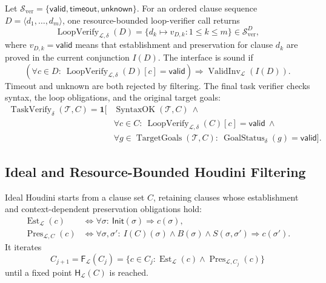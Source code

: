 Let \(\mathcal S_{\mathrm{ver}}=
\{\mathsf{valid},\mathsf{timeout},\mathsf{unknown}\}\).  For an ordered
clause sequence \(D=\langle d_1,\ldots,d_m\rangle\), one resource-bounded
loop-verifier call returns
\begin{equation}
  \operatorname{LoopVerify}_{\mathcal L,\delta}(D)
  =\{d_k\mapsto v_{D,k}:1\le k\le m\}
  \in\mathcal S_{\mathrm{ver}}^{D},
  \label{eq:formal-loop-verify-map}
\end{equation}
where \(v_{D,k}=\mathsf{valid}\) means that establishment and preservation
for clause \(d_k\) are proved in the current conjunction \(I(D)\).  The
interface is sound if
\begin{equation}
  \left(\forall c\in D:\
    \operatorname{LoopVerify}_{\mathcal L,\delta}(D)[c]=\mathsf{valid}\right)
  \Rightarrow \operatorname{ValidInv}_{\mathcal L}(I(D)).
  \label{eq:formal-loop-verify-soundness}
\end{equation}
Timeout and unknown are both rejected by filtering.  The final task verifier
checks syntax, the loop obligations, and the original target goals:
\begin{equation}
\begin{split}
\operatorname{TaskVerify}_{\delta}(\mathcal T,C)
=\mathbf 1\bigl[&\operatorname{SyntaxOK}(\mathcal T,C)\ \land\\
&\forall c\in C:\
  \operatorname{LoopVerify}_{\mathcal L,\delta}(C)[c]=\mathsf{valid}\ \land\\
&\forall g\in\operatorname{TargetGoals}(\mathcal T,C):\
  \operatorname{GoalStatus}_{\delta}(g)=\mathsf{valid}\bigr].
\end{split}
\label{eq:formal-task-verify}
\end{equation}

\subsection{Ideal and Resource-Bounded Houdini Filtering}
\label{app:formal-houdini}

Ideal Houdini starts from a clause set \(C\), retaining clauses whose
establishment and context-dependent preservation obligations hold:
\begin{equation}
  \begin{split}
  \operatorname{Est}_{\mathcal L}(c)
    &\iff \forall\sigma:\
      \mathsf{Init}(\sigma)\Rightarrow c(\sigma),\\
  \operatorname{Pres}_{\mathcal L,C}(c)
    &\iff \forall\sigma,\sigma':\
      I(C)(\sigma)\land B(\sigma)\land S(\sigma,\sigma')
      \Rightarrow c(\sigma').
  \end{split}
  \label{eq:formal-clause-obligations}
\end{equation}
It iterates
\begin{equation}
  C_{j+1}=\mathsf F_{\mathcal L}(C_j)
  =\{c\in C_j:\operatorname{Est}_{\mathcal L}(c)
    \land\operatorname{Pres}_{\mathcal L,C_j}(c)\}
  \label{eq:formal-houdini}
\end{equation}
until a fixed point \(\mathsf H_{\mathcal L}(C)\) is reached.

